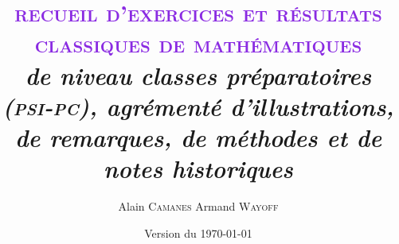 \documentclass[
	a4paper, %
	fontsize=11pt, %
	twoside=true, %
	chapterentrydots=true, %
	numbers=noenddot, %
]{kaobook}
\begin{document}


\title[Recueil des Exercices et Résultats Classiques de Mathématiques]{
\fontsize{26pt}{28pt}\selectfont
\textcolor{BlueViolet}{\textrm{\textsc{
recueil d'exercices et résultats classiques de mathématiques
}}}
\\ \vspace{0.6cm}
\fontsize{16pt}{18pt}\selectfont
\textrm{\textsl{
de niveau classes préparatoires (\textsc{psi}-\textsc{pc}), agrémenté d’illustrations, de remarques, de méthodes et de notes historiques
}}
\\}

\author[Alain Camanes, Armand Wayoff]{Alain \textsc{Camanes} \coauteur Armand \textsc{Wayoff}}

\date{Version du \today}



\frontmatter %



\maketitle


\pageblanche
\end{document}
